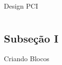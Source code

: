 \begin{frame}{Design PCI}
{\begin{columns}

        \end{columns}

        \begin{figure}
            \centering
        \end{figure}

    }
    
    
    
    
    
\end{frame}



\subsection{Subseção I}
\begin{frame}{Criando Blocos}

\end{frame}
